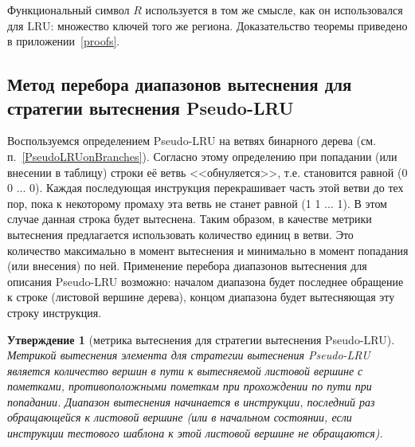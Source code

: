\documentclass[14pt]{extreport}
\newtheorem{utv}{Утверждение}
\newcommand{\LRU}{\textsf{LRU}\xspace}
\newcommand{\FIFO}{\textsf{FIFO}\xspace}
\newcommand{\PseudoLRU}{\textsf{Pseudo-LRU}\xspace}
\begin{document}
Функциональный символ $R$ используется в том же смысле, как он использовался для \LRU:  множество ключей того же региона. Доказательство теоремы приведено в приложении~\ref{proofs}.

\subsection{Метод перебора диапазонов вытеснения для стратегии
вытеснения \PseudoLRU}

Воспользуемся определением \PseudoLRU на ветвях бинарного дерева
(см. п.~\ref{PseudoLRUonBranches}). Согласно этому определению при
попадании (или внесении в таблицу) строки её ветвь
<<обнуляется>>, т.е. становится равной (0 0 ... 0). Каждая
последующая инструкция перекрашивает часть этой ветви до тех пор,
пока к некоторому промаху эта ветвь не станет равной (1 1 ...
1). В этом случае данная строка будет вытеснена. Таким образом, в
качестве метрики вытеснения предлагается использовать количество
единиц в ветви. Это количество максимально в момент вытеснения и
минимально в момент попадания (или внесения) по ней.
Применение перебора диапазонов вытеснения для описания \PseudoLRU
возможно: началом диапазона будет последнее обращение к строке
(листовой вершине дерева), концом диапазона будет вытесняющая эту строку инструкция.

\begin{utv}[метрика вытеснения для стратегии вытеснения \PseudoLRU]
Метрикой вытеснения элемента для стратегии вытеснения \PseudoLRU
является количество вершин в пути к вытесняемой листовой вершине с
пометками, противоположными пометкам при прохождении по пути при
попадании. Диапазон вытеснения начинается в инструкции,
последний раз обращающейся к листовой вершине (или в начальном
состоянии, если инструкции тестового шаблона к этой листовой вершине
не обращаются).
\end{utv}

\end{document}
